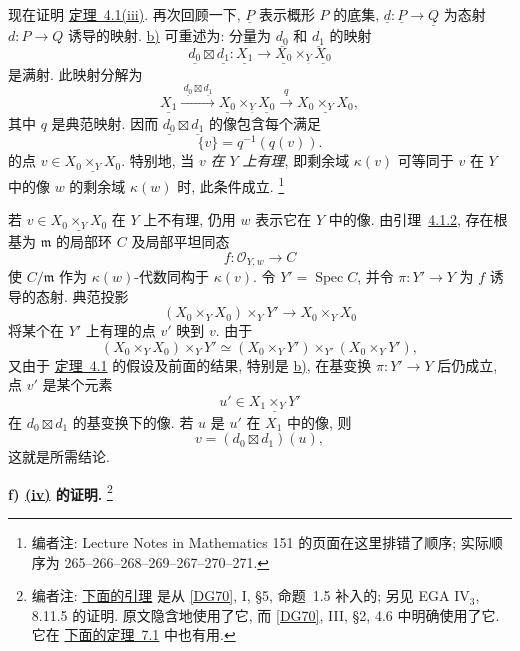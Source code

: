 
现在证明 \hyperref[thm:sga3-V-4.1-iii]{定理~4.1(iii)}.
再次回顾一下, \(\underline P\) 表示概形 \(P\) 的底集,
\(\underline d:\underline P\to\underline Q\) 为态射 \(d:P\to Q\)
诱导的映射. \hyperref[proof:sga3-V-4.1-b]{b)} 可重述为:
分量为 \(\underline{d_0}\) 和 \(\underline{d_1}\) 的映射
\[
  \underline{d_0}\boxtimes\underline{d_1}:
  \underline{X_1}\longrightarrow
  \underline{X_0}\times_{\underline Y}\underline{X_0}
\]
是满射. 此映射分解为
\[
  \underline{X_1}
  \xrightarrow{\ \underline{d_0}\boxtimes\underline{d_1}\ }
  \underline{X_0}\times_{\underline Y}\underline{X_0}
  \xrightarrow{\ q\ }
  \underline{X_0\times_YX_0},
\]
其中 \(q\) 是典范映射. 因而 \(\underline{d_0}\boxtimes\underline{d_1}\)
的像包含每个满足
\[
  \{v\}=q^{-1}(q(v)).
\]
的点 \(v\in\underline{X_0\times_YX_0}\).
特别地, 当 \(v\) \emph{在 \(Y\) 上有理},
即剩余域 \(\kappa(v)\) 可等同于 \(v\) 在 \(Y\) 中的像 \(w\)
的剩余域 \(\kappa(w)\) 时, 此条件成立.%
\footnote{\label{note:sga3-V-23}编者注: Lecture Notes in Mathematics
151 的页面在这里排错了顺序; 实际顺序为
265--266--268--269--267--270--271.}

若 \(v\in\underline{X_0\times_YX_0}\) 在 \(Y\) 上不有理,
仍用 \(w\) 表示它在 \(Y\) 中的像.
由引理~\hyperref[lem:sga3-V-4.1.2]{4.1.2},
存在根基为 \(\mathfrak m\) 的局部环 \(C\) 及局部平坦同态
\[
  f:\mathcal O_{Y,w}\longrightarrow C
\]
使 \(C/\mathfrak m\) 作为 \(\kappa(w)\)-代数同构于 \(\kappa(v)\).
令 \(Y'=\operatorname{Spec}C\), 并令 \(\pi:Y'\to Y\) 为 \(f\) 诱导的态射.
典范投影
\[
  (X_0\times_YX_0)\times_YY'\longrightarrow X_0\times_YX_0
\]
将某个在 \(Y'\) 上有理的点 \(v'\) 映到 \(v\).
由于
\[
  (X_0\times_YX_0)\times_YY'
  \simeq
  (X_0\times_YY')\times_{Y'}(X_0\times_YY'),
\]
又由于 \hyperref[thm:sga3-V-4.1]{定理~4.1} 的假设及前面的结果,
特别是 \hyperref[proof:sga3-V-4.1-b]{b)},
在基变换 \(\pi:Y'\to Y\) 后仍成立,
点 \(v'\) 是某个元素
\[
  u'\in\underline{X_1\times_YY'}
\]
在 \(d_0\boxtimes d_1\) 的基变换下的像.
若 \(u\) 是 \(u'\) 在 \(X_1\) 中的像, 则
\[
  v=(d_0\boxtimes d_1)(u),
\]
这就是所需结论.

\medskip
{}\label{proof:sga3-V-4.1-f}%
\noindent\textbf{f) \hyperref[thm:sga3-V-4.1-iv]{(iv)} 的证明.}%
\footnote{\label{note:sga3-V-24}编者注:
\hyperref[lem:sga3-V-4.1.3]{下面的引理} 是从
\hyperref[bib:sga3-V-DG70]{[DG70]}, I, \S5, 命题~1.5 补入的;
另见 EGA \(\mathrm{IV}_3\), 8.11.5 的证明.
原文隐含地使用了它, 而 \hyperref[bib:sga3-V-DG70]{[DG70]}, III,
\S2, 4.6 中明确使用了它.
它在 \hyperref[thm:sga3-V-7.1]{下面的定理~7.1} 中也有用.}

